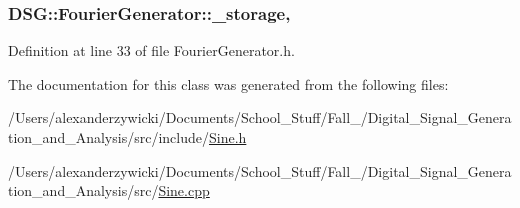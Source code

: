 \hypertarget{classDSG_1_1FourierGenerator_a6b7f2439b26914cc9df6b6975a2cedac}{
\subsubsection[{\+\_\+storage}]{ D\+S\+G\+::\+Fourier\+Generator\+::\+\_\+storage\hspace{0.3cm}{\ttfamily [protected]}, {\ttfamily [inherited]}}}\label{classDSG_1_1FourierGenerator_a6b7f2439b26914cc9df6b6975a2cedac}


Definition at line 33 of file Fourier\+Generator.\+h.



The documentation for this class was generated from the following files\+:\begin{DoxyCompactItemize}
\item 
/\+Users/alexanderzywicki/\+Documents/\+School\+\_\+\+Stuff/\+Fall\+\_/\+Digital\+\_\+\+Signal\+\_\+\+Generation\+\_\+and\+\_\+\+Analysis/src/include/\hyperlink{Sine_8h}{Sine.\+h}\item 
/\+Users/alexanderzywicki/\+Documents/\+School\+\_\+\+Stuff/\+Fall\+\_/\+Digital\+\_\+\+Signal\+\_\+\+Generation\+\_\+and\+\_\+\+Analysis/src/\hyperlink{Sine_8cpp}{Sine.\+cpp}\end{DoxyCompactItemize}
